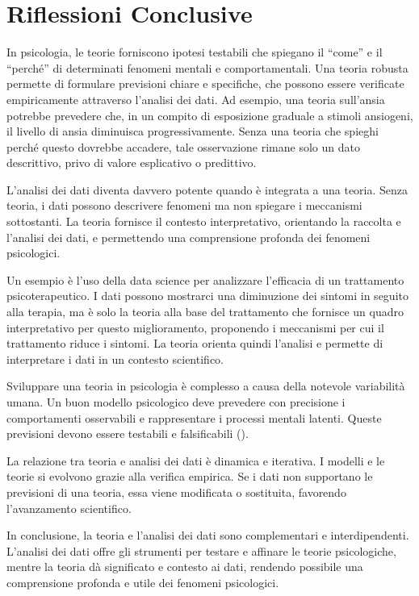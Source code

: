 \documentclass[
  letterpaper,
  DIV=11,
  numbers=noendperiod]{scrreprt}
\theoremstyle{definition}
\theoremstyle{remark}
\begin{document}
\section{Riflessioni Conclusive}\label{riflessioni-conclusive-1}

In psicologia, le teorie forniscono ipotesi testabili che spiegano il
``come'' e il ``perché'' di determinati fenomeni mentali e
comportamentali. Una teoria robusta permette di formulare previsioni
chiare e specifiche, che possono essere verificate empiricamente
attraverso l'analisi dei dati. Ad esempio, una teoria sull'ansia
potrebbe prevedere che, in un compito di esposizione graduale a stimoli
ansiogeni, il livello di ansia diminuisca progressivamente. Senza una
teoria che spieghi perché questo dovrebbe accadere, tale osservazione
rimane solo un dato descrittivo, privo di valore esplicativo o
predittivo.

L'analisi dei dati diventa davvero potente quando è integrata a una
teoria. Senza teoria, i dati possono descrivere fenomeni ma non spiegare
i meccanismi sottostanti. La teoria fornisce il contesto interpretativo,
orientando la raccolta e l'analisi dei dati, e permettendo una
comprensione profonda dei fenomeni psicologici.

Un esempio è l'uso della data science per analizzare l'efficacia di un
trattamento psicoterapeutico. I dati possono mostrarci una diminuzione
dei sintomi in seguito alla terapia, ma è solo la teoria alla base del
trattamento che fornisce un quadro interpretativo per questo
miglioramento, proponendo i meccanismi per cui il trattamento riduce i
sintomi. La teoria orienta quindi l'analisi e permette di interpretare i
dati in un contesto scientifico.

Sviluppare una teoria in psicologia è complesso a causa della notevole
variabilità umana. Un buon modello psicologico deve prevedere con
precisione i comportamenti osservabili e rappresentare i processi
mentali latenti. Queste previsioni devono essere testabili e
falsificabili ().

La relazione tra teoria e analisi dei dati è dinamica e iterativa. I
modelli e le teorie si evolvono grazie alla verifica empirica. Se i dati
non supportano le previsioni di una teoria, essa viene modificata o
sostituita, favorendo l'avanzamento scientifico.

In conclusione, la teoria e l'analisi dei dati sono complementari e
interdipendenti. L'analisi dei dati offre gli strumenti per testare e
affinare le teorie psicologiche, mentre la teoria dà significato e
contesto ai dati, rendendo possibile una comprensione profonda e utile
dei fenomeni psicologici.
\end{document}
